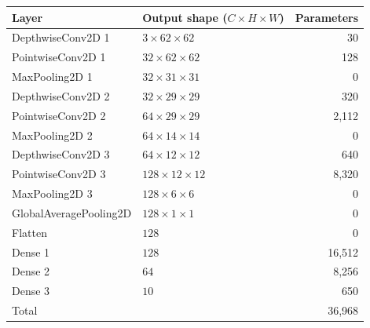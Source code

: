 \begin{tabular}{llr}
\hline
Layer & Output shape ($C \times H \times W$) & Parameters \\
\hline
DepthwiseConv2D 1 & $3 \times 62 \times 62$ & 30 \\
PointwiseConv2D 1 & $32 \times 62 \times 62$ & 128 \\
MaxPooling2D 1 & $32 \times 31 \times 31$ & 0 \\
DepthwiseConv2D 2 & $32 \times 29 \times 29$ & 320 \\
PointwiseConv2D 2 & $64 \times 29 \times 29$ & 2{,}112 \\
MaxPooling2D 2 & $64 \times 14 \times 14$ & 0 \\
DepthwiseConv2D 3 & $64 \times 12 \times 12$ & 640 \\
PointwiseConv2D 3 & $128 \times 12 \times 12$ & 8{,}320 \\
MaxPooling2D 3 & $128 \times 6 \times 6$ & 0 \\
GlobalAveragePooling2D & $128 \times 1 \times 1$ & 0 \\
Flatten & $128$ & 0 \\
Dense 1 & $128$ & 16{,}512 \\
Dense 2 & $64$ & 8{,}256 \\
Dense 3 & $10$ & 650 \\
\hline
Total & & 36{,}968 \\
\hline
\end{tabular}

